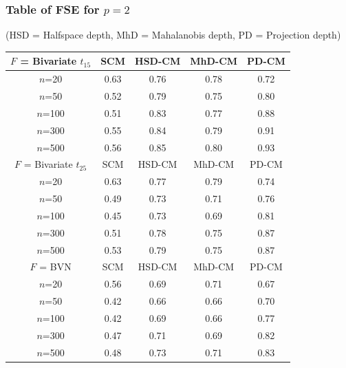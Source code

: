 \documentclass[handout,10pt]{beamer}
\begin{document}
\begin{frame}
\frametitle{Table of FSE for $p=2$}
(HSD = Halfspace depth, MhD = Mahalanobis depth, PD = Projection depth)
\begin{table}
\begin{footnotesize}
   \begin{tabular}{c|cccc}
    \hline
    $F$ = Bivariate $t_{15}$ & SCM  & HSD-CM & MhD-CM & PD-CM \\ \hline
    $n$=20                        & 0.63 & 0.76   & 0.78   & 0.72  \\
    $n$=50                        & 0.52 & 0.79   & 0.75   & 0.80  \\
    $n$=100                       & 0.51 & 0.83   & 0.77   & 0.88  \\
    $n$=300                       & 0.55 & 0.84   & 0.79   & 0.91  \\
    $n$=500                       & 0.56 & 0.85   & 0.80   & 0.93  \\ \hline
    $F$ = Bivariate $t_{25}$ & SCM  & HSD-CM & MhD-CM & PD-CM \\ \hline
    $n$=20                        & 0.63 & 0.77   & 0.79   & 0.74  \\
    $n$=50                        & 0.49 & 0.73   & 0.71   & 0.76  \\
    $n$=100                       & 0.45 & 0.73   & 0.69   & 0.81  \\
    $n$=300                       & 0.51 & 0.78   & 0.75   & 0.87  \\
    $n$=500                       & 0.53 & 0.79   & 0.75   & 0.87  \\ \hline
    $F$ = BVN                     & SCM  & HSD-CM & MhD-CM & PD-CM \\ \hline
    $n$=20                        & 0.56 & 0.69   & 0.71   & 0.67  \\
    $n$=50                        & 0.42 & 0.66   & 0.66   & 0.70  \\
    $n$=100                       & 0.42 & 0.69   & 0.66   & 0.77  \\
    $n$=300                       & 0.47 & 0.71   & 0.69   & 0.82  \\
    $n$=500                       & 0.48 & 0.73   & 0.71   & 0.83  \\ \hline
    \end{tabular}
\end{footnotesize}
\label{table:FSEtable2}
\end{table}
\end{frame}
\end{document}

